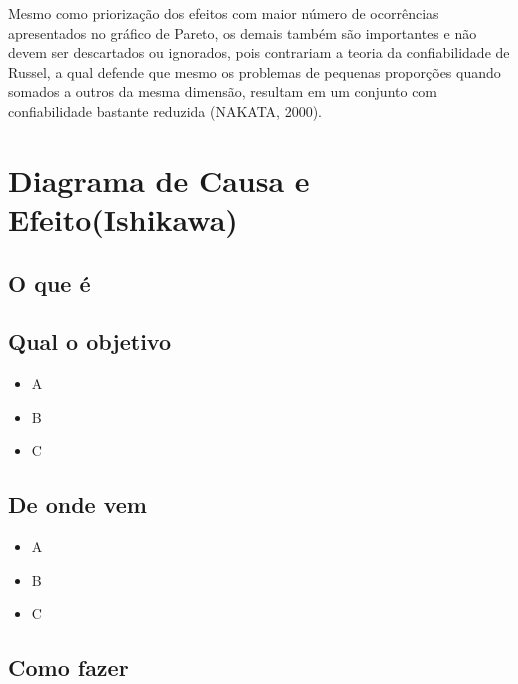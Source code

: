 \documentclass[
]{article}
\providecommand{\tightlist}{%
  \setlength{\itemsep}{0pt}\setlength{\parskip}{0pt}}
\begin{document}
Mesmo como priorização dos efeitos com maior número de ocorrências apresentados no gráfico de Pareto, os demais também são importantes e não devem ser descartados ou ignorados, pois contrariam a teoria da confiabilidade de Russel, a qual defende que mesmo os problemas de pequenas proporções quando somados a outros da mesma dimensão, resultam em um conjunto com confiabilidade bastante reduzida (NAKATA, 2000).

\hypertarget{diagrama-de-causa-e-efeitoishikawa}{%
\section{Diagrama de Causa e Efeito(Ishikawa)}\label{diagrama-de-causa-e-efeitoishikawa}}

\hypertarget{o-que-uxe9-3}{%
\subsection*{O que é}\label{o-que-uxe9-3}}

\hypertarget{qual-o-objetivo-3}{%
\subsection*{Qual o objetivo}\label{qual-o-objetivo-3}}

\begin{itemize}
\tightlist
\item
  A
\item
  B
\item
  C
\end{itemize}

\hypertarget{de-onde-vem-3}{%
\subsection*{De onde vem}\label{de-onde-vem-3}}

\begin{itemize}
\tightlist
\item
  A
\item
  B
\item
  C
\end{itemize}

\hypertarget{como-fazer-3}{%
\subsection*{Como fazer}\label{como-fazer-3}}
\end{document}
